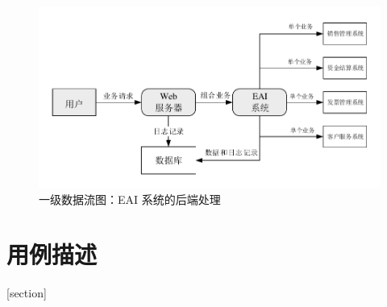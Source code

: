 \documentclass[cs4size,a4paper,nofonts]{ctexart}
\begin{document}
\begin{figure}[htp]
\includegraphics[width=\textwidth,page=3]{images/dfd.pdf}
\caption{\label{dfd1.2}一级数据流图：EAI 系统的后端处理}
\end{figure}

\section{用例描述}

[section]
\renewcommand{\theuccounter}{\arabic{section}.\arabic{uccounter}}
\newcommand*{\ucref}[1]{\hyperref[{uc:#1}]{用例~\ref*{uc:#1}：#1}}
\newcommand{\usecasedes}[9]{\CTEXnoindent
\refstepcounter{uccounter}
{{\label{uc:#1}}\bf{用例~\theuccounter ：#1}}
\begin{enumerate}[label={\arabic*.}]
\item 目标

#2
\item 事件流
\begin{enumerate}[label*={\arabic*}]
\item 基本流程

#3
\begin{enumerate}[label={(\arabic*)}]
#4
\end{enumerate}
\item 可选流程

#5
\begin{enumerate}[label={(\arabic*)}]
#6
\end{enumerate}
\end{enumerate}
\item 特殊需求

#7
\item 前提条件

#8
\item 后置条件

#9
\end{enumerate}
\CTEXindent}
\end{document}
